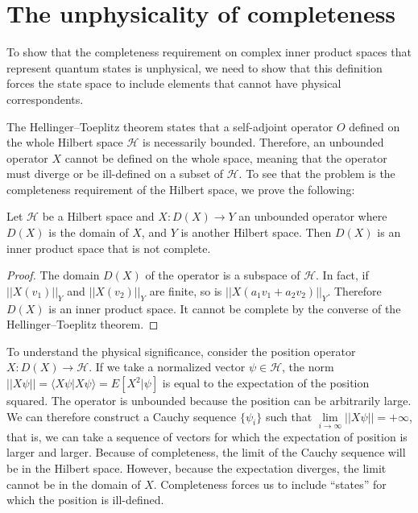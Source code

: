 \documentclass[10pt,twocolumn, nofootinbib]{revtex4-2}
\def\>{\rangle}
\def\<{\langle}
\begin{document}
\section{The unphysicality of completeness}

To show that the completeness requirement on complex inner product spaces that represent quantum states is unphysical, we need to show that this definition forces the state space to include elements that cannot have physical correspondents.

The Hellinger–Toeplitz theorem states that a self-adjoint operator $O$ defined on the whole Hilbert space $\mathcal{H}$ is necessarily bounded. Therefore, an unbounded operator $X$ cannot be defined on the whole space, meaning that the operator must diverge or be ill-defined on a subset of $\mathcal{H}$. To see that the problem is the completeness requirement of the Hilbert space, we prove the following:
\begin{prop}
Let $\mathcal{H}$ be a Hilbert space and $X : D(X) \to Y$ an unbounded operator where $D(X)$ is the domain of $X$, and $Y$ is another Hilbert space. Then $D(X)$ is an inner product space that is not complete.
\end{prop}
\begin{proof}
The domain $D(X)$ of the operator is a subspace of $\mathcal{H}$. In fact, if $||X(v_1)||_Y$ and $||X(v_2)||_Y$ are finite, so is $||X(a_1 v_1+a_2v_2)||_Y$. Therefore $D(X)$ is an inner product space. It cannot be complete by the converse of the Hellinger–Toeplitz theorem.
\end{proof}

To understand the physical significance, consider the position operator $X : D(X) \to \mathcal{H}$. If we take a normalized vector $\psi \in \mathcal{H}$, the norm $||X\psi|| = \<X\psi|X\psi\> = E[X^2|\psi]$ is equal to the expectation of the position squared. The operator is unbounded because the position can be arbitrarily large. We can therefore construct a Cauchy sequence $\{\psi_i\}$ such that $\lim\limits_{i \to \infty}||X\psi|| = +\infty$, that is, we can take a sequence of vectors for which the expectation of position is larger and larger. Because of completeness, the limit of the Cauchy sequence will be in the Hilbert space. However, because the expectation diverges, the limit cannot be in the domain of $X$. Completeness forces us to include ``states'' for which the position is ill-defined.
\end{document}
